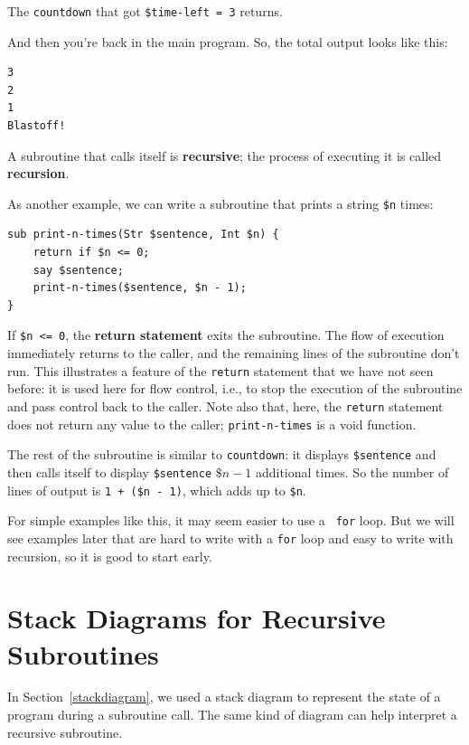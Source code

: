 The {\tt countdown} that got {\tt \$time-left = 3} returns.

And then you're back in the main program.  So, the
total output looks like this:

\begin{verbatim}
3
2
1
Blastoff!
\end{verbatim}
%
A subroutine that calls itself is {\bf recursive}; the process of
executing it is called {\bf recursion}.

As another example, we can write a subroutine that prints a
string {\tt \$n} times:

\begin{verbatim}
sub print-n-times(Str $sentence, Int $n) {
    return if $n <= 0;
    say $sentence;
    print-n-times($sentence, $n - 1);
}
\end{verbatim}
%
If {\tt \$n <= 0}, the {\bf return statement} exits the
subroutine.  The flow of execution immediately returns to 
the caller, and the remaining lines of the subroutine don't
run. This illustrates a feature of the {\tt return} statement 
that we have not seen before: it is used here for flow 
control, i.e., to stop the execution of the subroutine and 
pass control back to the caller. Note also that, here, the 
{\tt return} statement does not return any value to the 
caller; {\tt print-n-times} is a void function.


The rest of the subroutine is similar to {\tt countdown}: it 
displays {\tt \$sentence} and then calls itself to display 
{\tt \$sentence} $\$n - 1$ additional times.  So the number 
of lines of output is {\tt 1 + (\$n - 1)}, which
adds up to {\tt \$n}.

For simple examples like this, it may seem easier to use a {\tt
for} loop.  But we will see examples later that are hard to write
with a {\tt for} loop and easy to write with recursion, so it is
good to start early.


\section{Stack Diagrams for Recursive Subroutines}
\label{recursive.stack}

In Section~\ref{stackdiagram}, we used a stack diagram to represent
the state of a program during a subroutine call.  The same kind of
diagram can help interpret a recursive subroutine.

